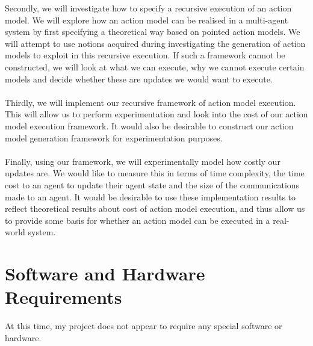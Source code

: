 \documentclass[12pt, a4paper]{article}
\begin{document}
Secondly, we will investigate how to specify a recursive execution of an action
model.
We will explore how an action model can be realised in a multi-agent system by
first specifying a theoretical way based on pointed action models.
We will attempt to use notions acquired during investigating the generation of
action models to exploit in this recursive execution.
If such a framework cannot be constructed, we will look at what we can execute,
why we cannot execute certain models and decide whether these are updates we
would want to execute.\\
\\
Thirdly, we will implement our recursive framework of action model execution.
This will allow us to perform experimentation and look into the cost of our
action model execution framework.
It would also be desirable to construct our action model generation framework
for experimentation purposes.\\
\\
Finally, using our framework, we will experimentally model how costly our
updates are.
We would like to measure this in terms of time complexity, the time cost to an agent to update
their agent state and the size of the communications made to an agent.
It would be desirable to use these implementation results to reflect theoretical
results about cost of action model execution, and thus allow us to provide some
basis for whether an action model can be executed in a real-world system.
%
\section*{Software and Hardware Requirements}
At this time, my project does not appear to require any special software or hardware.
\end{document}
